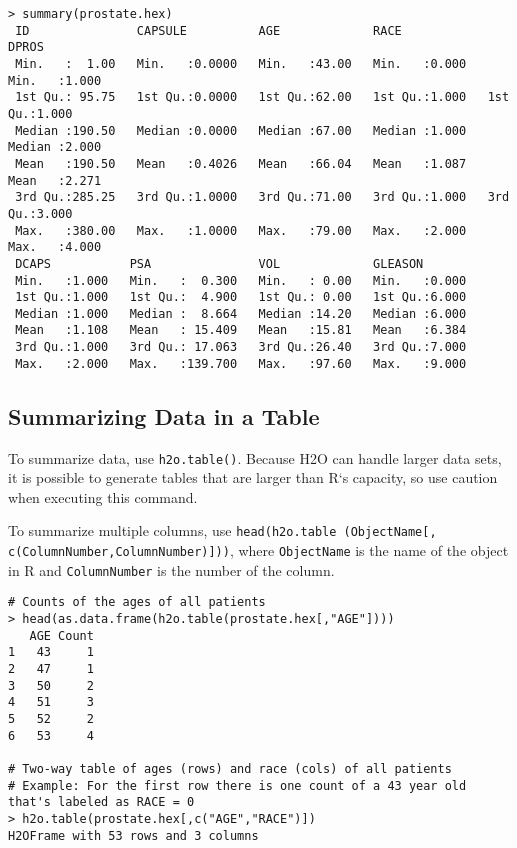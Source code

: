 {{\begin{lstlisting}[style=R]
> summary(prostate.hex)
 ID               CAPSULE          AGE             RACE            DPROS          
 Min.   :  1.00   Min.   :0.0000   Min.   :43.00   Min.   :0.000   Min.   :1.000  
 1st Qu.: 95.75   1st Qu.:0.0000   1st Qu.:62.00   1st Qu.:1.000   1st Qu.:1.000  
 Median :190.50   Median :0.0000   Median :67.00   Median :1.000   Median :2.000  
 Mean   :190.50   Mean   :0.4026   Mean   :66.04   Mean   :1.087   Mean   :2.271  
 3rd Qu.:285.25   3rd Qu.:1.0000   3rd Qu.:71.00   3rd Qu.:1.000   3rd Qu.:3.000  
 Max.   :380.00   Max.   :1.0000   Max.   :79.00   Max.   :2.000   Max.   :4.000  
 DCAPS           PSA               VOL             GLEASON        
 Min.   :1.000   Min.   :  0.300   Min.   : 0.00   Min.   :0.000  
 1st Qu.:1.000   1st Qu.:  4.900   1st Qu.: 0.00   1st Qu.:6.000  
 Median :1.000   Median :  8.664   Median :14.20   Median :6.000  
 Mean   :1.108   Mean   : 15.409   Mean   :15.81   Mean   :6.384  
 3rd Qu.:1.000   3rd Qu.: 17.063   3rd Qu.:26.40   3rd Qu.:7.000  
 Max.   :2.000   Max.   :139.700   Max.   :97.60   Max.   :9.000
\end{lstlisting}

\newpage

\subsection{Summarizing Data in a Table}

To summarize data, use {\texttt{h2o.table()}}. Because H2O can handle larger data sets, it is possible to generate tables that are larger than R`s capacity, so use caution when executing this command. 

To summarize multiple columns, use {\texttt{head(h2o.table (ObjectName[, c(ColumnNumber,ColumnNumber)]))}}, where {\texttt{ObjectName}} is the name of the object in R and {\texttt{ColumnNumber}} is the number of the column. 


\begin{lstlisting}[style=R]
# Counts of the ages of all patients
> head(as.data.frame(h2o.table(prostate.hex[,"AGE"])))
   AGE Count
1   43     1
2   47     1
3   50     2
4   51     3
5   52     2
6   53     4

# Two-way table of ages (rows) and race (cols) of all patients
# Example: For the first row there is one count of a 43 year old that's labeled as RACE = 0
> h2o.table(prostate.hex[,c("AGE","RACE")])
H2OFrame with 53 rows and 3 columns


\end{lstlisting}}}
